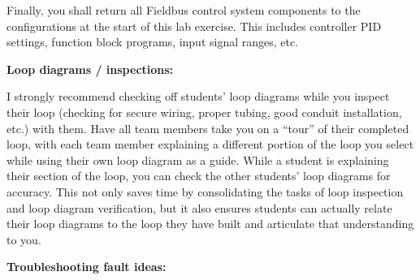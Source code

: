 \vskip 10pt

Finally, you shall return all Fieldbus control system components to the configurations at the start of this lab exercise.  This includes controller PID settings, function block programs, input signal ranges, etc.















\noindent
{\bf Loop diagrams / inspections:}

I strongly recommend checking off students' loop diagrams while you inspect their loop (checking for secure wiring, proper tubing, good conduit installation, etc.) with them.  Have all team members take you on a ``tour'' of their completed loop, with each team member explaining a different portion of the loop you select while using their own loop diagram as a guide.  While a student is explaining their section of the loop, you can check the other students' loop diagrams for accuracy.  This not only saves time by consolidating the tasks of loop inspection and loop diagram verification, but it also ensures students can actually relate their loop diagrams to the loop they have built and articulate that understanding to you.

\vskip 10pt

\goodbreak

\noindent
{\bf Troubleshooting fault ideas:}

